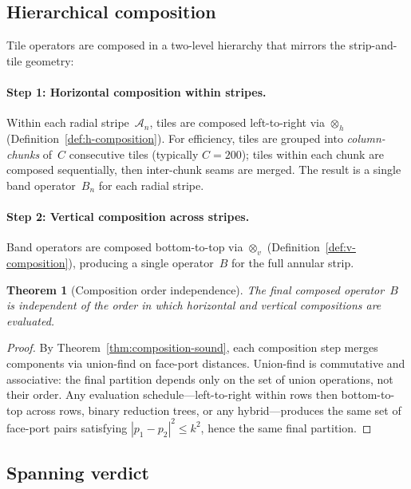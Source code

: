 \documentclass[11pt,a4paper]{article}
\theoremstyle{definition}
\theoremstyle{plain}
\newtheorem{theorem}{Theorem}[section]
\theoremstyle{remark}
\begin{document}
\subsection{Hierarchical composition}

Tile operators are composed in a two-level hierarchy that mirrors the strip-and-tile geometry:

\paragraph{Step 1: Horizontal composition within stripes.}
Within each radial stripe~$\mathcal{A}_n$, tiles are composed left-to-right via $\otimes_h$ (Definition~\ref{def:h-composition}).  For efficiency, tiles are grouped into \emph{column-chunks} of~$C$ consecutive tiles (typically $C = 200$); tiles within each chunk are composed sequentially, then inter-chunk seams are merged.  The result is a single band operator~$B_n$ for each radial stripe.

\paragraph{Step 2: Vertical composition across stripes.}
Band operators are composed bottom-to-top via $\otimes_v$ (Definition~\ref{def:v-composition}), producing a single operator~$B$ for the full annular strip.

\begin{theorem}[Composition order independence]\label{thm:fs-order}
The final composed operator~$B$ is independent of the order in which horizontal and vertical compositions are evaluated.
\end{theorem}

\begin{proof}
By Theorem~\ref{thm:composition-sound}, each composition step merges components via union-find on face-port distances.  Union-find is commutative and associative: the final partition depends only on the set of union operations, not their order.  Any evaluation schedule---left-to-right within rows then bottom-to-top across rows, binary reduction trees, or any hybrid---produces the same set of face-port pairs satisfying $|p_1 - p_2|^2 \le k^2$, hence the same final partition.
\end{proof}

\subsection{Spanning verdict}
\end{document}

